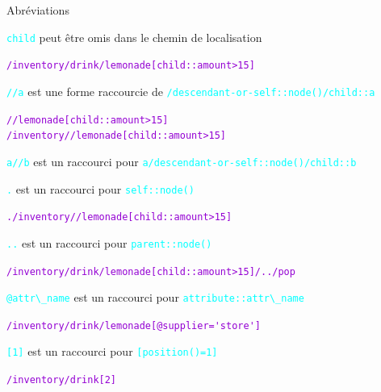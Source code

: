 \begin{frame}{Abréviations}

\textcolor{cyan}{\verb?child?} peut \^etre omis dans le chemin de localisation\\

\begin{flushright}
\textcolor{DarkViolet}{\verb?/inventory/drink/lemonade[child::amount>15]?}
\end{flushright}


\textcolor{cyan}{\verb?//a?} est une forme raccourcie de \textcolor{cyan}{\verb?/descendant-or-self::node()/child::a?}\\
\begin{flushright}
\textcolor{DarkViolet}{\verb?//lemonade[child::amount>15]?\\
\verb?/inventory//lemonade[child::amount>15]?}
\end{flushright}


\textcolor{cyan}{\verb?a//b?} est un raccourci pour \textcolor{cyan}{\verb?a/descendant-or-self::node()/child::b?}\\

\bigskip

\textcolor{cyan}{\verb?.?} est un raccourci pour \textcolor{cyan}{\verb?self::node()?}\\

\begin{flushright}
\textcolor{DarkViolet}{\verb?./inventory//lemonade[child::amount>15]?}
\end{flushright}

\textcolor{cyan}{\verb?..?} est un raccourci pour \textcolor{cyan}{\verb?parent::node()?}\\

\begin{flushright}
\textcolor{DarkViolet}{\verb?/inventory/drink/lemonade[child::amount>15]/../pop?}
\end{flushright}

\textcolor{cyan}{\verb?@attr\_name?} est un raccourci pour \textcolor{cyan}{\verb?attribute::attr\_name?}\\

\begin{flushright}
\textcolor{DarkViolet}{\verb?/inventory/drink/lemonade[@supplier='store']?}
\end{flushright}

\textcolor{cyan}{\verb?[1]?} est un raccourci pour \textcolor{cyan}{\verb?[position()=1]?}

\begin{flushright}
\textcolor{DarkViolet}{\verb?/inventory/drink[2]?}
\end{flushright}

\end{frame}

